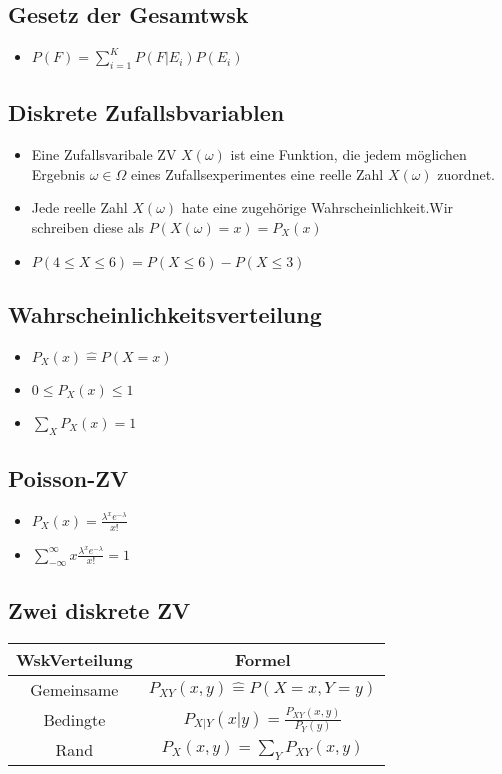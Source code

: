 \documentclass{article}
\begin{document}
\subsection{Gesetz der Gesamtwsk}
\begin{itemize}
\item $P(F) = \sum_{i=1}^K P(F|E_i)P(E_i)$
\end{itemize}



\subsection{Diskrete Zufallsbvariablen}

\begin{itemize}
\item Eine Zufallsvaribale ZV $X(\omega)$ ist eine Funktion, die jedem möglichen \newline Ergebnis $\omega \in \Omega$ eines Zufallsexperimentes eine reelle Zahl $X(\omega)$ zuordnet.
\item Jede reelle Zahl $X(\omega)$ hate eine zugehörige Wahrscheinlichkeit.\newline Wir schreiben diese als $P(X(\omega) = x) = P_X(x)$
\item $P(4\leq X \leq 6) = P(X\leq 6) -P(X \leq 3)$
\end{itemize}

\subsection{Wahrscheinlichkeitsverteilung}
\begin{itemize}
\item $P_X(x) \hat{=} P(X=x)$
\item $ 0 \leq P_X(x) \leq 1$
\item $\sum_X P_X(x) = 1$
\end{itemize}

\subsection{Poisson-ZV}
\begin{itemize}
\item $P_X(x) = \frac{\lambda^x e^{-\lambda}}{x!}$
\item $\sum_{-\infty}^\infty x\frac{\lambda^x e^{-\lambda}}{x!} = 1$
\end{itemize}


\subsection{Zwei diskrete ZV}
\begin{tabular}{c | c}
WskVerteilung & Formel \\ \hline
Gemeinsame & $P_{XY}(x,y) \hat{=} P(X=x,Y=y)$\\
Bedingte& $P_{X|Y}(x|y) = \frac{P_{XY}(x,y)}{P_Y(y)}$\\
Rand & $P_X(x,y) = \sum_Y P_{XY}(x,y)$\\

\end{tabular}
\end{document}
